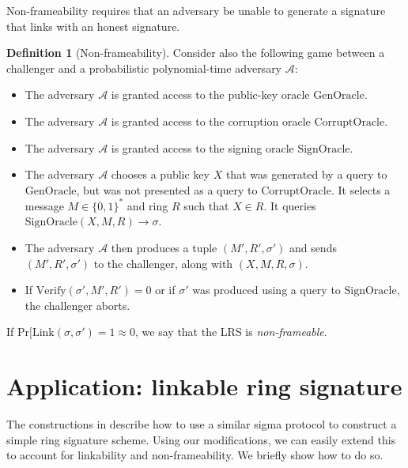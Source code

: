 \documentclass{article}
\newcommand{\A}{\mathcal{A}}
\theoremstyle{definition}
\newtheorem{definition}{Definition}
\begin{document}
Non-frameability requires that an adversary be unable to generate a signature that links with an honest signature.
\begin{definition}[Non-frameability]
Consider also the following game between a challenger and a probabilistic polynomial-time adversary $\A$:
\begin{itemize}
\item The adversary $\A$ is granted access to the public-key oracle $\text{GenOracle}$.
\item The adversary $\A$ is granted access to the corruption oracle $\text{CorruptOracle}$.
\item The adversary $\A$ is granted access to the signing oracle $\text{SignOracle}$.
\item The adversary $\A$ chooses a public key $X$ that was generated by a query to $\text{GenOracle}$, but was not presented as a query to $\text{CorruptOracle}$.
It selects a message $M \in \{0,1\}^*$ and ring $R$ such that $X \in R$.
It queries $\text{SignOracle}(X,M,R) \to \sigma$.
\item The adversary $\A$ then produces a tuple $(M',R',\sigma')$ and sends $(M',R',\sigma')$ to the challenger, along with $(X,M,R,\sigma)$.
\item If $\text{Verify}(\sigma',M',R') = 0$ or if $\sigma'$ was produced using a query to $\text{SignOracle}$, the challenger aborts.
\end{itemize}
If $\text{Pr}[ \text{Link}(\sigma,\sigma') = 1 \approx 0$, we say that the LRS is \textit{non-frameable}.
\end{definition}


\section{Application: linkable ring signature}
The constructions in \cite{groth,bootle} describe how to use a similar sigma protocol to construct a simple ring signature scheme.
Using our modifications, we can easily extend this to account for linkability and non-frameability.
We briefly show how to do so.
\end{document}
